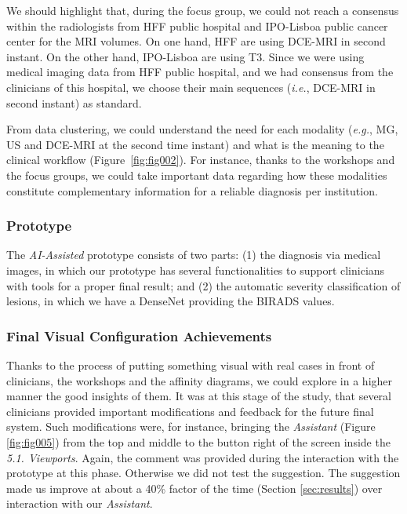 
\clearpage

We should highlight that, during the focus group, we could not reach a consensus within the radiologists from HFF public hospital and IPO-Lisboa public cancer center for the MRI volumes.
On one hand, HFF are using DCE-MRI in second instant.
On the other hand, IPO-Lisboa are using T3.
Since we were using medical imaging data from HFF public hospital, and we had consensus from the clinicians of this hospital, we choose their main sequences ({\it i.e.}, DCE-MRI in second instant) as standard.

From data clustering, we could understand the need for each modality ({\it e.g.}, MG, US and DCE-MRI at the second time instant) and what is the meaning to the clinical workflow (Figure~\ref{fig:fig002}).
For instance, thanks to the workshops and the focus groups, we could take important data regarding how these modalities constitute complementary information for a reliable diagnosis per institution.

\subsubsection{Prototype}
\label{sec:prototype}

The {\it AI-Assisted} prototype consists of two parts:
(1) the diagnosis via medical images, in which our prototype has several functionalities to support clinicians with tools for a proper final result; and
(2) the automatic severity classification of lesions, in which we have a DenseNet providing the BIRADS values.

\subsubsection{Final Visual Configuration Achievements}

Thanks to the process of putting something visual with real cases in front of clinicians, the workshops and the affinity diagrams, we could explore in a higher manner the good insights of them.
It was at this stage of the study, that several clinicians provided important modifications and feedback for the future final system.
Such modifications were, for instance, bringing the {\it Assistant} (Figure \ref{fig:fig005}) from the top and middle to the button right of the screen inside the {\it 5.1. Viewports}.
Again, the comment was provided during the interaction with the prototype at this phase.
Otherwise we did not test the suggestion.
The suggestion made us improve at about a 40\% factor of the time (Section \ref{sec:results}) over interaction with our {\it Assistant}.

